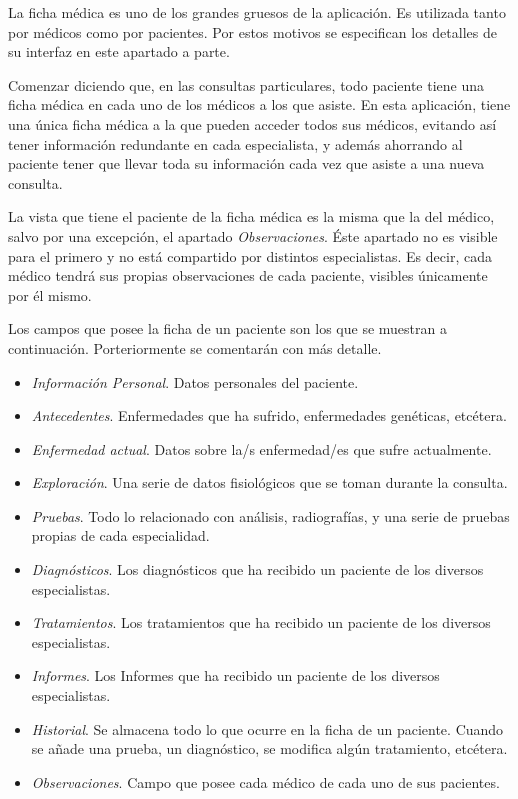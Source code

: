 		La ficha médica es uno de los grandes gruesos de la aplicación. Es utilizada tanto por médicos como por pacientes. Por estos motivos se especifican los detalles de su interfaz en este apartado a parte.
		
		Comenzar diciendo que, en las consultas particulares, todo paciente tiene una ficha médica en cada uno de los médicos a los que asiste. En esta aplicación, tiene una única ficha médica a la que pueden acceder todos sus médicos, evitando así tener información redundante en cada especialista, y además ahorrando al paciente tener que llevar toda su información cada vez que asiste a una nueva consulta.
		
		La vista que tiene el paciente de la ficha médica es la misma que la del médico, salvo por una excepción, el apartado \textit{Observaciones}. Éste apartado no es visible para el primero y no está compartido por distintos especialistas. Es decir, cada médico tendrá sus propias observaciones de cada paciente, visibles únicamente por él mismo. 
		
		Los campos que posee la ficha de un paciente son los que se muestran a continuación. Porteriormente se comentarán con más detalle.
		
		\begin{itemize}
			\item \textit{Información Personal}. Datos personales del paciente.
			\item \textit{Antecedentes}. Enfermedades que ha sufrido, enfermedades genéticas, etcétera.
			\item \textit{Enfermedad actual}. Datos sobre la/s enfermedad/es que sufre actualmente.
			\item \textit{Exploración}. Una serie de datos fisiológicos que se toman durante la consulta.
			\item \textit{Pruebas}. Todo lo relacionado con análisis, radiografías, y una serie de pruebas propias de cada especialidad.
			\item \textit{Diagnósticos}. Los diagnósticos que ha recibido un paciente de los diversos especialistas.
			\item \textit{Tratamientos}. Los tratamientos que ha recibido un paciente de los diversos especialistas.
			\item \textit{Informes}. Los Informes que ha recibido un paciente de los diversos especialistas.
			\item \textit{Historial}. Se almacena todo lo que ocurre en la ficha de un paciente. Cuando se añade una prueba, un diagnóstico, se modifica algún tratamiento, etcétera.
			\item \textit{Observaciones}. Campo que posee cada médico de cada uno de sus pacientes.
		\end{itemize}
		
